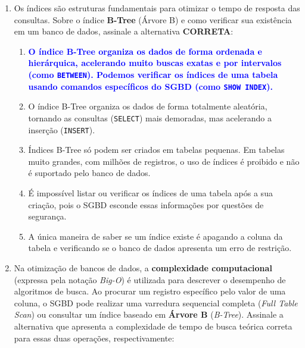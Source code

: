 \documentclass[12pt,a4paper]{article}
\begin{document}
\begin{enumerate}
    \vspace{0.5cm}

    \item  Os índices são estruturas fundamentais para otimizar o tempo de resposta das consultas. Sobre o índice \textbf{B-Tree} (Árvore B) e como verificar sua existência em um banco de dados, assinale a alternativa \textbf{CORRETA}:
    
    \begin{enumerate}[label=\alph*)]
        \item[\textbf{\textcolor{blue}{a)}}] \textcolor{blue}{\textbf{O índice B-Tree organiza os dados de forma ordenada e hierárquica, acelerando muito buscas exatas e por intervalos (como \texttt{BETWEEN}). Podemos verificar os índices de uma tabela usando comandos específicos do SGBD (como \texttt{SHOW INDEX}).}}
        \item O índice B-Tree organiza os dados de forma totalmente aleatória, tornando as consultas (\texttt{SELECT}) mais demoradas, mas acelerando a inserção (\texttt{INSERT}).
        \item Índices B-Tree só podem ser criados em tabelas pequenas. Em tabelas muito grandes, com milhões de registros, o uso de índices é proibido e não é suportado pelo banco de dados.
        \item É impossível listar ou verificar os índices de uma tabela após a sua criação, pois o SGBD esconde essas informações por questões de segurança.
        \item A única maneira de saber se um índice existe é apagando a coluna da tabela e verificando se o banco de dados apresenta um erro de restrição.
    \end{enumerate}

    \vspace{0.5cm}

    \item  Na otimização de bancos de dados, a \textbf{complexidade computacional} (expressa pela notação \textit{Big-O}) é utilizada para descrever o desempenho de algoritmos de busca. Ao procurar um registro específico pelo valor de uma coluna, o SGBD pode realizar uma varredura sequencial completa (\textit{Full Table Scan}) ou consultar um índice baseado em \textbf{Árvore B} (\textit{B-Tree}). Assinale a alternativa que apresenta a complexidade de tempo de busca teórica correta para essas duas operações, respectivamente:
    

\end{enumerate}
\end{document}
